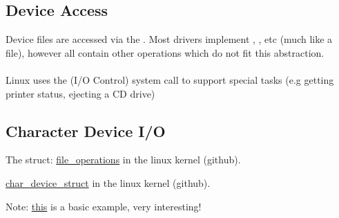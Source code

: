 \documentclass{report}
\begin{document}
\subsection*{Device Access}
Device files are accessed via the .
Most drivers implement , ,  etc (much like a file), however all contain other operations which do not fit this abstraction.
\\
\\ Linux uses the  (I/O Control) system call to support special tasks (e.g getting printer status, ejecting a CD drive)
\subsection*{Character Device I/O}
The  struct:
\href{https://github.com/torvalds/linux/blob/8ced7ca3570333998ad2088d5a6275701970e28e/include/linux/fs.h#L2069}{file\_operations} in the linux kernel (github).

\href{https://github.com/torvalds/linux/blob/3498e7f2bb415e447354a3debef6738d9655768c/fs/char_dev.c#L34}{char\_device\_struct} in the linux kernel (github).

Note: \href{https://tldp.org/LDP/lkmpg/2.4/html/c577.htm}{this} is a basic example, very interesting!
\end{document}
